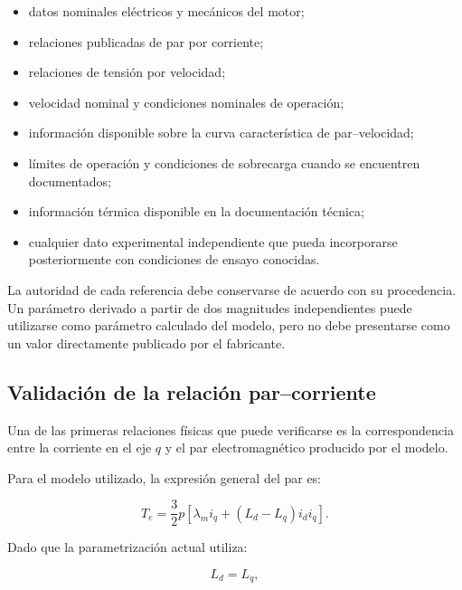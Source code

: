 \begin{itemize}

\item datos nominales eléctricos y mecánicos del motor;

\item relaciones publicadas de par por corriente;

\item relaciones de tensión por velocidad;

\item velocidad nominal y condiciones nominales de operación;

\item información disponible sobre la curva característica de par--velocidad;

\item límites de operación y condiciones de sobrecarga cuando se encuentren documentados;

\item información térmica disponible en la documentación técnica;

\item cualquier dato experimental independiente que pueda incorporarse posteriormente con condiciones de ensayo conocidas.

\end{itemize}

La autoridad de cada referencia debe conservarse de acuerdo con su procedencia. Un parámetro derivado a partir de dos magnitudes independientes puede utilizarse como parámetro calculado del modelo, pero no debe presentarse como un valor directamente publicado por el fabricante.

\subsection{Validación de la relación par--corriente}

Una de las primeras relaciones físicas que puede verificarse es la correspondencia entre la corriente en el eje \(q\) y el par electromagnético producido por el modelo.

Para el modelo utilizado, la expresión general del par es:

\begin{equation}
T_e=
\frac{3}{2}
p
\left[
\lambda_m i_q+
(L_d-L_q)i_d i_q
\right].
\end{equation}

Dado que la parametrización actual utiliza:

\begin{equation}
L_d=L_q,
\end{equation}

